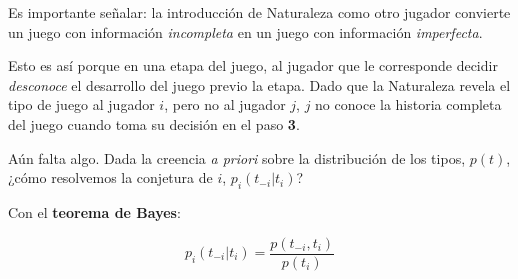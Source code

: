 \documentclass[12pt]{article}
\begin{document}
Es importante señalar: la introducción de Naturaleza como otro jugador convierte un juego con información \textit{incompleta} en un juego con información \textit{imperfecta}.

Esto es así porque en una etapa del juego, al jugador que le corresponde decidir \textit{desconoce} el desarrollo del juego previo la etapa. Dado que la Naturaleza revela el tipo de juego al jugador $i$, pero no al jugador $j$, $j$ no conoce la historia completa del juego cuando toma su decisión en el paso \textbf{3}.

Aún falta algo. Dada la creencia \textit{a priori} sobre la distribución de los tipos, $p(t)$, ¿cómo resolvemos la conjetura de $i$, $p_i(t_{-i}|t_i)$?

Con el \textbf{teorema de Bayes}:

\[ p_i(t_{-i}|t_i) = \frac{p(t_{-i}, t_i)}{p(t_i)} \]








\end{document}

